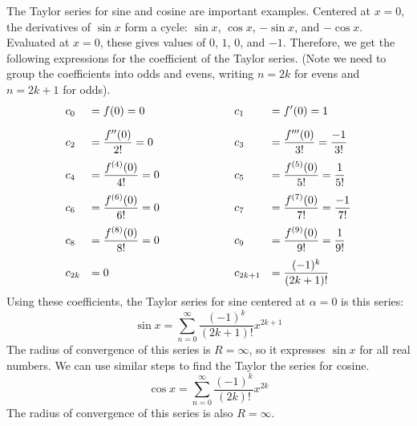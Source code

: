 \documentclass[fleqn]{report}
\begin{document}
\begin{example}
The Taylor series for sine and cosine are important
examples. Centered at $x=0$, the derivatives of $\sin x$ form a
cycle: $\sin x$, $\cos x$, $-\sin x$, and $-\cos x$.
Evaluated at $x=0$, these gives values of $0$, $1$, $0$, and
$-1$. Therefore, we get the following expressions for the
coefficient of the Taylor series. (Note we need to group the
coefficients into odds and evens, writing $n= 2k$ for evens
and $n = 2k+1$ for odds).
\begin{displaymath}
\begin{array}{*4{>{\displaystyle}l}}
c_0 & = f(0) = 0 & 
\hspace{2cm} c_1 & = f^\prime(0) = 1 \\[1em]
c_2 & = \frac{f^{\prime\prime}(0)}{2!} = 0 & 
\hspace{2cm} c_3 & = \frac{f^{\prime\prime\prime}(0)}{3!} =
\frac{-1}{3!} \\[1em]
c_4 & = \frac{f^{(4)}(0)}{4!} = 0 & 
\hspace{2cm} c_5 & = \frac{f^{(5)}(0)}{5!} = \frac{1}{5!}
\\[1em]
c_6 & = \frac{f^{(6)}(0)}{6!} = 0 & 
\hspace{2cm} c_7 & = \frac{f^{(7)}(0)}{7!} = \frac{-1}{7!}
\\[1em]
c_8 & = \frac{f^{(8)}(0)}{8!} = 0 & 
\hspace{2cm} c_9 & = \frac{f^{(9)}(0)}{9!} = \frac{1}{9!}
\\[1em]
c_{2k} & = 0 & 
\hspace{2cm} c_{2k+1} & = \frac{(-1)^k}{(2k+1)!}
\end{array}
\end{displaymath}
Using these coefficients, the Taylor series for sine centered
at $\alpha = 0$ is this series:
\begin{equation*}
\sin x = \sum_{n=0}^\infty \frac{(-1)^k}{(2k+1)!} x^{2k+1}
\end{equation*}
The radius of convergence of this series is $R = \infty$, so
it expresses $\sin x$ for all real numbers. We can use similar
steps to find the Taylor the series for cosine.
\begin{equation*}
\cos x = \sum_{n=0}^\infty \frac{(-1)^k}{(2k)!} x^{2k}
\end{equation*}
The radius of convergence of this series is also $R = \infty$. 
\end{example}
\end{document}
